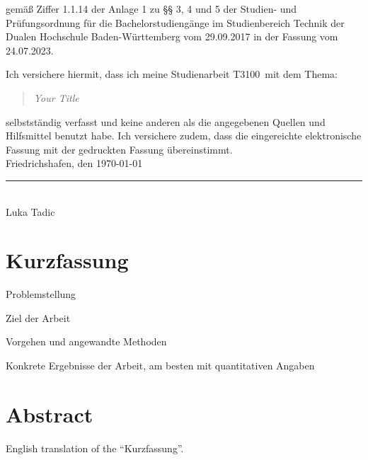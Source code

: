 \documentclass{scrbook} %
\newcommand{\titel}{Your Title}
\newcommand{\arbeit}{Studienarbeit T3100}
\newcommand{\autor}{Luka Tadic}
\begin{document}
gemäß Ziffer 1.1.14 der Anlage 1 zu §§ 3, 4 und 5  
der Studien- und Prüfungsordnung für die Bachelorstudiengänge im Studienbereich Technik  
der Dualen Hochschule Baden-Württemberg vom 29.09.2017 in der Fassung vom 24.07.2023.

Ich versichere hiermit, dass ich meine \arbeit\ mit dem Thema:

\begin{quote}
    \textit{\titel}
\end{quote}

selbstständig verfasst und keine anderen als die angegebenen Quellen und Hilfsmittel benutzt habe.  
Ich versichere zudem, dass die eingereichte elektronische Fassung mit der gedruckten Fassung übereinstimmt.\\[6ex]

Friedrichshafen, den \today \\[1ex]
\rule[-0.2cm]{5cm}{0.5pt} \\
\autor \\[10ex]

\rmfamily

\chapter*{Kurzfassung} %

Problemstellung

Ziel der Arbeit

Vorgehen und angewandte Methoden

Konkrete Ergebnisse der Arbeit, am besten mit quantitativen Angaben

\clearpage

\chapter*{Abstract} %

English translation of the “Kurzfassung”.

\clearpage

\end{document}
